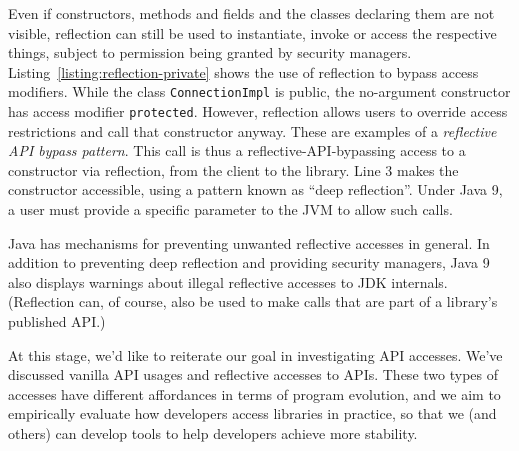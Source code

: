Even if constructors, methods and fields and the classes declaring them are not visible, reflection can still be used to instantiate, invoke or access the respective things, subject to permission being granted by security managers. Listing~\ref{listing:reflection-private} shows the use of reflection to bypass access modifiers. While the class \texttt{ConnectionImpl} is public, the no-argument constructor has access modifier \texttt{protected}. However, reflection allows users to override access restrictions and call that constructor anyway. These are examples of a \textit{reflective API bypass pattern}. This call is thus a reflective-API-bypassing access to a constructor via reflection, from the client to the library. Line 3 makes the constructor accessible, using a pattern known as ``deep reflection''. Under Java 9, a user must provide a specific parameter to the JVM to allow such calls.

Java has mechanisms for preventing unwanted reflective accesses in general. In addition to preventing deep reflection and providing security managers, Java 9 also displays warnings about illegal reflective accesses to JDK internals. (Reflection can, of course, also be used to make calls that are part of a library's published API.)





At this stage, we'd like to reiterate our goal in investigating API accesses. We've discussed vanilla API usages and reflective accesses to APIs. These two types of accesses have different affordances in terms of program evolution, and we aim to empirically evaluate how developers access libraries in practice, so that we (and others) can develop tools to help developers achieve more stability.

